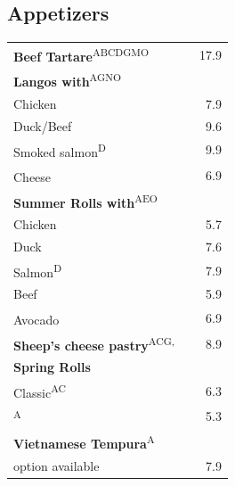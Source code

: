 \documentclass[a4paper,12pt]{article}
\newcommand{\vegan}{\textbf{\scriptsize \color{vegan}{Vegan}}}
\newcommand{\vegetarisch}{\textbf{\scriptsize \color{vegan}{Veg}}}
\begin{document}
\begin{multicols}{2}
\section*{Appetizers}
\begin{tabular}{Lrr}
\textbf{Beef Tartare}\textsuperscript{{\scriptsize ABCDGMO}} & & 17.9\vspace{0.1cm}\\
\textbf{Langos with}\textsuperscript{{\scriptsize AGNO}}\\
\hspace{0.4cm}Chicken & & 7.9\\
\hspace{0.4cm}Duck/Beef & & 9.6\\
\hspace{0.4cm}Smoked salmon\textsuperscript{{\scriptsize D}} & & 9.9\\
\hspace{0.4cm}Cheese\textsuperscript{\vegetarisch} & & 6.9\vspace{0.1cm}\\
\textbf{Summer Rolls with}\textsuperscript{{\scriptsize AEO}}\\
\hspace{0.4cm}Chicken & & 5.7\\
\hspace{0.4cm}Duck & & 7.6\\
\hspace{0.4cm}Salmon\textsuperscript{{\scriptsize D}} & & 7.9\\
\hspace{0.4cm}Beef & & 5.9\\
\hspace{0.4cm}Avocado\textsuperscript{{\scriptsize \vegan}} & & 6.9\vspace{0.1cm}\\
\textbf{Sheep's cheese pastry}\textsuperscript{{\scriptsize ACG, \vegetarisch}} & & 8.9\vspace{0.1cm}\\
\textbf{Spring Rolls}\\
\hspace{0.4cm}Classic\textsuperscript{{\scriptsize AC}} & & 6.3\\
\textsuperscript{{\scriptsize A}} & & 5.3\vspace{0.1cm}\\
\textbf{Vietnamese Tempura}\textsuperscript{{\scriptsize A}}\\
\hspace{0.4cm}\scriptsize {} option available & & 7.9
\end{tabular}


\end{multicols}
\end{document}
